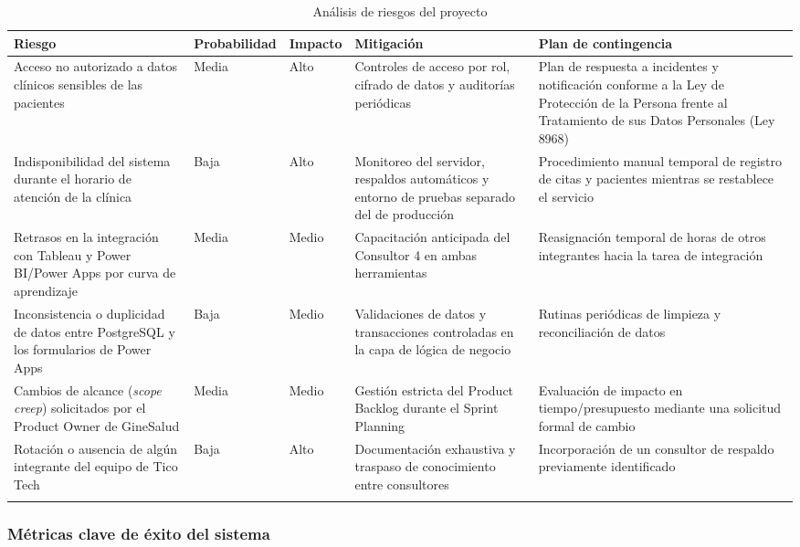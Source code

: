 \documentclass[12pt,letterpaper]{article}
\begin{document}
\begin{xltabular}{\textwidth}{|X|>{\centering\arraybackslash}p{1.5cm}|>{\centering\arraybackslash}p{1.5cm}|X|X|}
\hline
{}
\textbf{Riesgo} & \textbf{Probabilidad} & \textbf{Impacto} & \textbf{Mitigación} & \textbf{Plan de contingencia} \\
\hline
\endhead
Acceso no autorizado a datos clínicos sensibles de las pacientes & Media & Alto & Controles de acceso por rol, cifrado de datos y auditorías periódicas & Plan de respuesta a incidentes y notificación conforme a la Ley de Protección de la Persona frente al Tratamiento de sus Datos Personales (Ley 8968) \\
\hline
Indisponibilidad del sistema durante el horario de atención de la clínica & Baja & Alto & Monitoreo del servidor, respaldos automáticos y entorno de pruebas separado del de producción & Procedimiento manual temporal de registro de citas y pacientes mientras se restablece el servicio \\
\hline
Retrasos en la integración con Tableau y Power BI/Power Apps por curva de aprendizaje & Media & Medio & Capacitación anticipada del Consultor 4 en ambas herramientas & Reasignación temporal de horas de otros integrantes hacia la tarea de integración \\
\hline
Inconsistencia o duplicidad de datos entre PostgreSQL y los formularios de Power Apps & Baja & Medio & Validaciones de datos y transacciones controladas en la capa de lógica de negocio & Rutinas periódicas de limpieza y reconciliación de datos \\
\hline
Cambios de alcance (\textit{scope creep}) solicitados por el Product Owner de GineSalud & Media & Medio & Gestión estricta del Product Backlog durante el Sprint Planning & Evaluación de impacto en tiempo/presupuesto mediante una solicitud formal de cambio \\
\hline
Rotación o ausencia de algún integrante del equipo de Tico Tech & Baja & Alto & Documentación exhaustiva y traspaso de conocimiento entre consultores & Incorporación de un consultor de respaldo previamente identificado \\
\hline
\caption{Análisis de riesgos del proyecto}
\end{xltabular}

\subsubsection*{Métricas clave de éxito del sistema}
\end{document}
